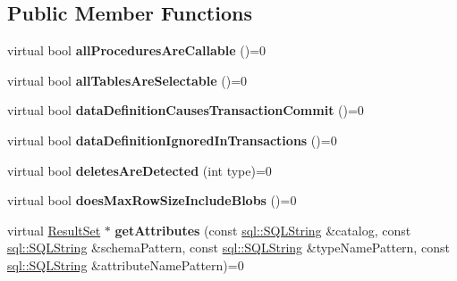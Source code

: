 \subsection*{Public Member Functions}
\begin{DoxyCompactItemize}
\item 
\hypertarget{classsql_1_1_database_meta_data_a0fcfa43f51cbe1bf0d25bae69fbb39ac}{}\label{classsql_1_1_database_meta_data_a0fcfa43f51cbe1bf0d25bae69fbb39ac} 
virtual bool {\bfseries all\+Procedures\+Are\+Callable} ()=0
\item 
\hypertarget{classsql_1_1_database_meta_data_a087fca0afb7cace4db77c16490821acc}{}\label{classsql_1_1_database_meta_data_a087fca0afb7cace4db77c16490821acc} 
virtual bool {\bfseries all\+Tables\+Are\+Selectable} ()=0
\item 
\hypertarget{classsql_1_1_database_meta_data_a8307e470f11b1136fb30b0f85031d2da}{}\label{classsql_1_1_database_meta_data_a8307e470f11b1136fb30b0f85031d2da} 
virtual bool {\bfseries data\+Definition\+Causes\+Transaction\+Commit} ()=0
\item 
\hypertarget{classsql_1_1_database_meta_data_a6d0ab535bca802cba072bb2ac3cb1c95}{}\label{classsql_1_1_database_meta_data_a6d0ab535bca802cba072bb2ac3cb1c95} 
virtual bool {\bfseries data\+Definition\+Ignored\+In\+Transactions} ()=0
\item 
\hypertarget{classsql_1_1_database_meta_data_a0ff634280a6fd1054e7808f8a6da2d0f}{}\label{classsql_1_1_database_meta_data_a0ff634280a6fd1054e7808f8a6da2d0f} 
virtual bool {\bfseries deletes\+Are\+Detected} (int type)=0
\item 
\hypertarget{classsql_1_1_database_meta_data_a5928f3cd90d2880bf49689b5f696e8a2}{}\label{classsql_1_1_database_meta_data_a5928f3cd90d2880bf49689b5f696e8a2} 
virtual bool {\bfseries does\+Max\+Row\+Size\+Include\+Blobs} ()=0
\item 
\hypertarget{classsql_1_1_database_meta_data_a8c95252297cfa93887646dfab1e930ae}{}\label{classsql_1_1_database_meta_data_a8c95252297cfa93887646dfab1e930ae} 
virtual \hyperlink{classsql_1_1_result_set}{Result\+Set} $\ast$ {\bfseries get\+Attributes} (const \hyperlink{classsql_1_1_s_q_l_string}{sql\+::\+S\+Q\+L\+String} \&catalog, const \hyperlink{classsql_1_1_s_q_l_string}{sql\+::\+S\+Q\+L\+String} \&schema\+Pattern, const \hyperlink{classsql_1_1_s_q_l_string}{sql\+::\+S\+Q\+L\+String} \&type\+Name\+Pattern, const \hyperlink{classsql_1_1_s_q_l_string}{sql\+::\+S\+Q\+L\+String} \&attribute\+Name\+Pattern)=0
\item 
\hypertarget{classsql_1_1_database_meta_data_a3914f9fec48b670034357dceedbce42a}{}\label{classsql_1_1_database_meta_data_a3914f9fec48b670034357dceedbce42a} 

\end{DoxyCompactItemize}
